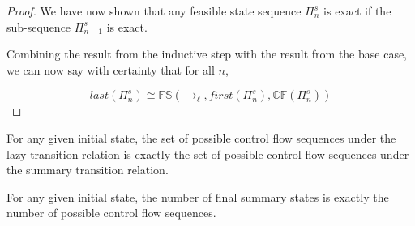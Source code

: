 \begin{proof}
We have now shown that any feasible state sequence $\Pi_n^s$ is exact if the sub-sequence $\Pi_{n-1}^s$ is exact.

Combining the result from the inductive step with the result from the base case, we can now say with certainty that for all $n$,

$$\mathit{last}(\Pi_n^s) \cong \mathbb{FS}(\rightarrow_\ell, \mathit{first}(\Pi_n^s), \mathbb{CF}(\Pi_n^s) ) $$

\end{proof}

\begin{corollary}
For any given initial state, the set of possible control flow sequences under the lazy transition relation is exactly the set of possible control flow sequences under the summary transition relation.
\end{corollary}

\begin{corollary}
For any given initial state, the number of final summary states is exactly the number of possible control flow sequences.
\end{corollary}


